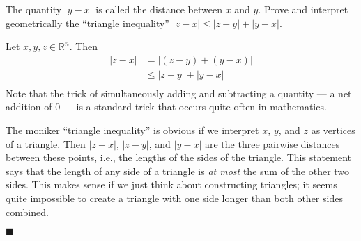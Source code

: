 \documentclass[12pt]{article}
\renewcommand{\qed}{\hfill$\blacksquare$}
\renewenvironment{proof}{\begin{addmargin}[1em]{0em}\begin{newproof}}{\end{newproof}\end{addmargin}\qed}
\newenvironment{problem}[2][Problem]{\begin{trivlist}
\item[\hskip \labelsep {\bfseries #1}\hskip \labelsep {\bfseries #2.}]}{\end{trivlist}}
\begin{document}
\begin{problem}{1-5}
The quantity $\left|y-x\right|$ is called the distance between $x$ and $y$. Prove and interpret geometrically the ``triangle inequality'' $\left|z-x\right| \leq \left|z-y\right| + \left|y-x\right|$.
\end{problem}
\begin{proof}
Let $x,y,z \in \mathbb{R}^n$. Then
\begin{equation*}
\begin{split}
\left|z-x\right| & = \left| \left(z-y\right) + \left(y-x\right) \right| \\
& \leq \left|z-y\right| + \left|y-x\right| \\
\end{split}
\end{equation*}
Note that the trick of simultaneously adding and subtracting a quantity --- a net addition of 0 --- is a standard trick that occurs quite often in mathematics.

The moniker ``triangle inequality'' is obvious if we interpret $x$, $y$, and $z$ as vertices of a triangle. Then $\left|z-x\right|$, $\left|z-y\right|$, and $\left|y-x\right|$ are the three pairwise distances between these points, i.e., the lengths of the sides of the triangle. This statement says that the length of any side of a triangle is \textit{at most} the sum of the other two sides. This makes sense if we just think about constructing triangles; it seems quite impossible to create a triangle with one side longer than both other sides combined. 
\end{proof}
\end{document}
